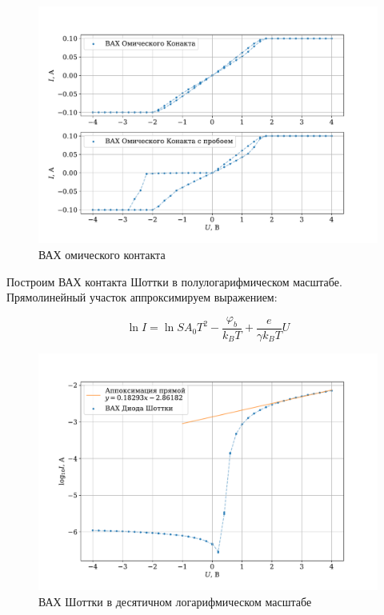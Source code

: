 \documentclass[a4paper,12pt]{article} %
\begin{document}
	\begin{figure}[h!]
		\centering
		\includegraphics[width=\textwidth]{vac_ohm.pdf}
		\caption{ВАХ омического контакта}
		\label{graph2}
	\end{figure}
	
Построим ВАХ контакта Шоттки в полулогарифмическом масштабе. Прямолинейный участок аппроксимируем выражением:

\begin{equation}
    \ln{I}= \ln{SA_0 T^2} - \frac{\varphi_b}{k_B T} + \frac{e}{\gamma k_B T} U
\end{equation}

	\begin{figure}[h!]
		\centering
		\includegraphics[width=\textwidth]{vac_log10_diode.pdf}
		\caption{ВАХ Шоттки в десятичном логарифмическом масштабе}
		\label{graph2}
	\end{figure}
\end{document}
